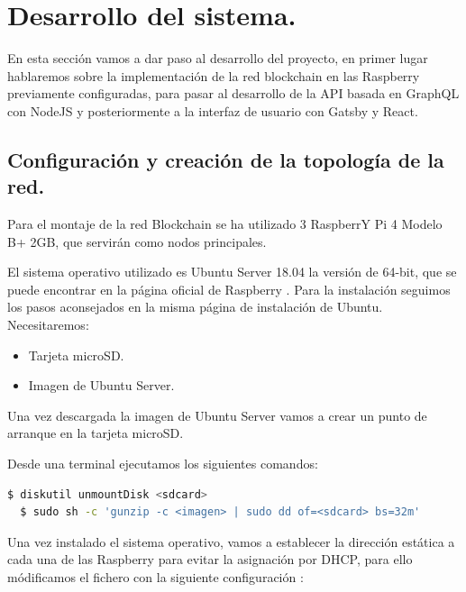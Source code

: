 \section{Desarrollo del sistema.}

En esta sección vamos a dar paso al desarrollo del proyecto, en primer lugar hablaremos sobre la implementación de la red
blockchain en las Raspberry previamente configuradas, para pasar al desarrollo de la API basada en GraphQL con NodeJS y 
posteriormente a la interfaz de usuario con Gatsby y React.  

\subsection{Configuración y creación de la topología de la red.}

Para el montaje de la red Blockchain se ha utilizado 3 RaspberrY Pi 4 Modelo B+ 2GB, que servirán como nodos principales.

\vspace{5mm}

\noindent El sistema operativo utilizado es Ubuntu Server 18.04 \cite{ubuntu-rasp} la versión de 64-bit, que se puede 
encontrar en la página oficial de Raspberry \cite{rasp-official-page}. Para la instalación seguimos los pasos aconsejados 
en la misma página de instalación de Ubuntu. Necesitaremos:

\begin{itemize}
  \item Tarjeta microSD.
  \item Imagen de Ubuntu Server.
\end{itemize}

\noindent Una vez descargada la imagen de Ubuntu Server vamos a crear un punto de arranque en la tarjeta microSD.

\vspace{5mm}

\noindent Desde una terminal ejecutamos los siguientes comandos:

\begin{lstlisting}[language=bash]
  $ diskutil unmountDisk <sdcard>
  $ sudo sh -c 'gunzip -c <imagen> | sudo dd of=<sdcard> bs=32m'
\end{lstlisting}

\vspace{5mm}

\noindent Una vez instalado el sistema operativo, vamos a establecer la dirección estática a cada una de las Raspberry
para evitar la asignación por DHCP, para ello módificamos el fichero  con la 
siguiente configuración \cite{configure-static-ip}:

